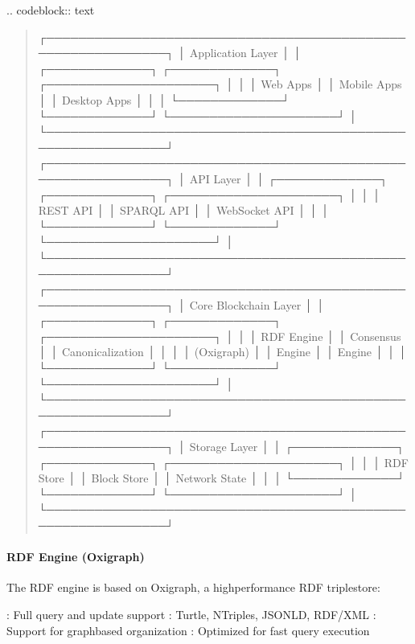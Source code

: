 \documentclass[letterpaper,10pt,english]{sphinxmanual}
\begin{document}
\sphinxAtStartPar
{}
.. code\sphinxhyphen{}block:: text
\begin{quote}

\sphinxAtStartPar
┌─────────────────────────────────────────────────────────────┐
│                    Application Layer                        │
│  ┌─────────────┐  ┌─────────────┐  ┌─────────────────────┐ │
│  │ Web Apps    │  │ Mobile Apps │  │ Desktop Apps        │ │
│  └─────────────┘  └─────────────┘  └─────────────────────┘ │
└─────────────────────────────────────────────────────────────┘
┌─────────────────────────────────────────────────────────────┐
│                      API Layer                              │
│  ┌─────────────┐  ┌─────────────┐  ┌─────────────────────┐ │
│  │ REST API    │  │ SPARQL API  │  │ WebSocket API       │ │
│  └─────────────┘  └─────────────┘  └─────────────────────┘ │
└─────────────────────────────────────────────────────────────┘
┌─────────────────────────────────────────────────────────────┐
│                   Core Blockchain Layer                     │
│  ┌─────────────┐  ┌─────────────┐  ┌─────────────────────┐ │
│  │ RDF Engine  │  │ Consensus   │  │ Canonicalization    │ │
│  │ (Oxigraph)  │  │ Engine      │  │ Engine              │ │
│  └─────────────┘  └─────────────┘  └─────────────────────┘ │
└─────────────────────────────────────────────────────────────┘
┌─────────────────────────────────────────────────────────────┐
│                    Storage Layer                            │
│  ┌─────────────┐  ┌─────────────┐  ┌─────────────────────┐ │
│  │ RDF Store   │  │ Block Store │  │ Network State       │ │
│  └─────────────┘  └─────────────┘  └─────────────────────┘ │
└─────────────────────────────────────────────────────────────┘
\end{quote}

\sphinxAtStartPar
{}


\paragraph{RDF Engine (Oxigraph)}
\label{\detokenize{research/technical-specifications:rdf-engine-oxigraph}}
\sphinxAtStartPar
The RDF engine is based on Oxigraph, a high\sphinxhyphen{}performance RDF triplestore:

\sphinxAtStartPar
{}
\sphinxhyphen{} : Full query and update support
\sphinxhyphen{} : Turtle, N\sphinxhyphen{}Triples, JSON\sphinxhyphen{}LD, RDF/XML
\sphinxhyphen{} : Support for graph\sphinxhyphen{}based organization
\sphinxhyphen{} : Optimized for fast query execution
\end{document}
